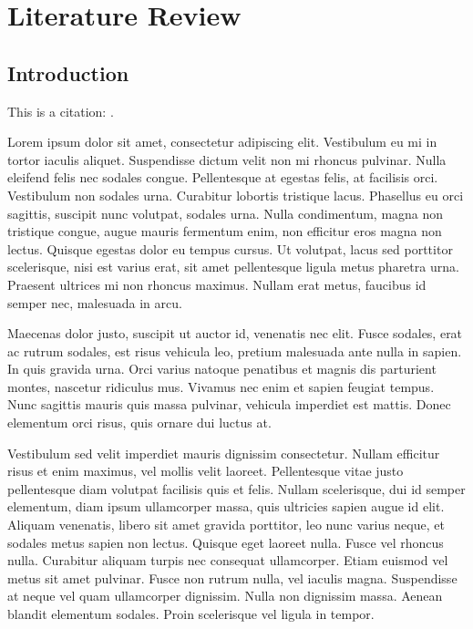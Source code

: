 \chapter{Literature Review}
\label{chap:LiteratureReview}
\section{Introduction}
\label{chap:LitIntro}

This is a citation: \cite{rosner2023} .

Lorem ipsum dolor sit amet, consectetur adipiscing elit. Vestibulum eu mi in tortor iaculis aliquet. Suspendisse dictum velit non mi rhoncus pulvinar. Nulla eleifend felis nec sodales congue. Pellentesque at egestas felis, at facilisis orci. Vestibulum non sodales urna. Curabitur lobortis tristique lacus. Phasellus eu orci sagittis, suscipit nunc volutpat, sodales urna. Nulla condimentum, magna non tristique congue, augue mauris fermentum enim, non efficitur eros magna non lectus. Quisque egestas dolor eu tempus cursus. Ut volutpat, lacus sed porttitor scelerisque, nisi est varius erat, sit amet pellentesque ligula metus pharetra urna. Praesent ultrices mi non rhoncus maximus. Nullam erat metus, faucibus id semper nec, malesuada in arcu.

Maecenas dolor justo, suscipit ut auctor id, venenatis nec elit. Fusce sodales, erat ac rutrum sodales, est risus vehicula leo, pretium malesuada ante nulla in sapien. In quis gravida urna. Orci varius natoque penatibus et magnis dis parturient montes, nascetur ridiculus mus. Vivamus nec enim et sapien feugiat tempus. Nunc sagittis mauris quis massa pulvinar, vehicula imperdiet est mattis. Donec elementum orci risus, quis ornare dui luctus at.

Vestibulum sed velit imperdiet mauris dignissim consectetur. Nullam efficitur risus et enim maximus, vel mollis velit laoreet. Pellentesque vitae justo pellentesque diam volutpat facilisis quis et felis. Nullam scelerisque, dui id semper elementum, diam ipsum ullamcorper massa, quis ultricies sapien augue id elit. Aliquam venenatis, libero sit amet gravida porttitor, leo nunc varius neque, et sodales metus sapien non lectus. Quisque eget laoreet nulla. Fusce vel rhoncus nulla. Curabitur aliquam turpis nec consequat ullamcorper. Etiam euismod vel metus sit amet pulvinar. Fusce non rutrum nulla, vel iaculis magna. Suspendisse at neque vel quam ullamcorper dignissim. Nulla non dignissim massa. Aenean blandit elementum sodales. Proin scelerisque vel ligula in tempor.

